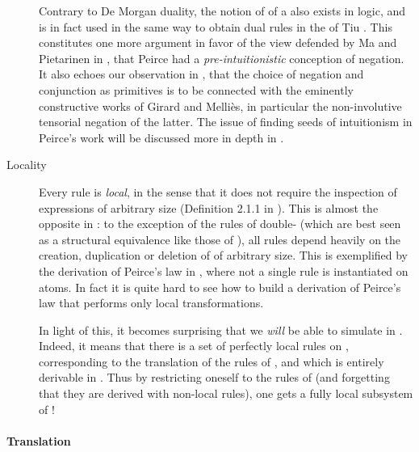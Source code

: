 \begin{scope}
\begin{scope}
\begin{description}
    \begin{remark}
      
    Contrary to De Morgan duality, the notion of  of a  also
    exists in  logic, and is in fact used in the same way to
    obtain dual rules in the    of
    Tiu \cite{tiu_local_2006}. This constitutes one more argument in favor of
    the view defended by Ma and Pietarinen in ,
    that Peirce had a \emph{pre-intuitionistic} conception of negation. It also
    echoes our observation in , that the choice of
    negation and conjunction as primitives is to be connected with the eminently
    constructive works of Girard and Melliès, in particular the non-involutive
    tensorial negation of the latter. The issue of finding seeds of intuitionism
    in Peirce's work will be discussed more in depth in .
    \end{remark}

  \item[Locality]
    Every rule is \emph{local}, in the sense that it does not require the
    inspection of expressions of arbitrary size (Definition 2.1.1 in
    \cite{tubella:hal-02390267}). This is almost the opposite in : to
    the exception of the rules of double- (which are best seen as a
    structural equivalence like those of ), all rules depend heavily on the
    creation, duplication or deletion of  of arbitrary size. This is
    exemplified by the derivation of Peirce's law in ,
    where not a single rule is instantiated on atoms. In fact it is quite hard
    to see how to build a derivation of Peirce's law that performs only local
    transformations.
    
    In light of this, it becomes surprising that we \emph{will} be able to
    simulate  in . Indeed, it means that there is a set
     of perfectly local rules on , corresponding to the
    translation of the rules of , and which is entirely derivable in
    . Thus by restricting oneself to the rules of 
    (and forgetting that they are derived with non-local rules), one gets a
    fully local subsystem of !
\end{description}

\paragraph{Translation}


\end{scope}
\end{scope}
